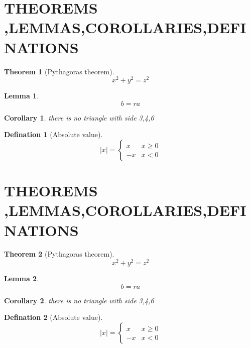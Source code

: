 \documentclass[12pt,a4paper]{article}
\newtheorem{theorem}{Theorem}[section]
\newtheorem{lemma}{Lemma}[theorem]
\newtheorem{corollary}{Corollary}[theorem]
\theoremstyle{defination}
\newtheorem{defination}{Defination}[section]
\begin{document}
\section{\LARGE {THEOREMS ,LEMMAS,COROLLARIES,DEFINATIONS}}
\begin{theorem}[Pythagoras theorem] \label{pyth}
\begin{equation}
x^2+y^2=z^2
\end{equation}
\end{theorem}
\begin{lemma}
\begin{equation}
b=ra
\end{equation}
\end{lemma}
\begin{corollary}
there is no triangle with side 3,4,6
\end{corollary}
\begin{defination}[Absolute value]
\begin{equation}
|x|=\begin {cases} x & x \geq 0 \\ -x & x<0 \end{cases}
\end{equation}
\end{defination}
\section{\LARGE {THEOREMS ,LEMMAS,COROLLARIES,DEFINATIONS}}
\begin{theorem}[Pythagoras theorem] \label{pyth}
\begin{equation}
x^2+y^2=z^2
\end{equation}
\end{theorem}
\begin{lemma}
\begin{equation}
b=ra
\end{equation}
\end{lemma}
\begin{corollary}
there is no triangle with side 3,4,6
\end{corollary}
\begin{defination}[Absolute value]
\begin{equation}
|x|=\begin {cases} x & x \geq 0 \\ -x & x<0 \end{cases}
\end{equation}
\end{defination}
\end{document}
